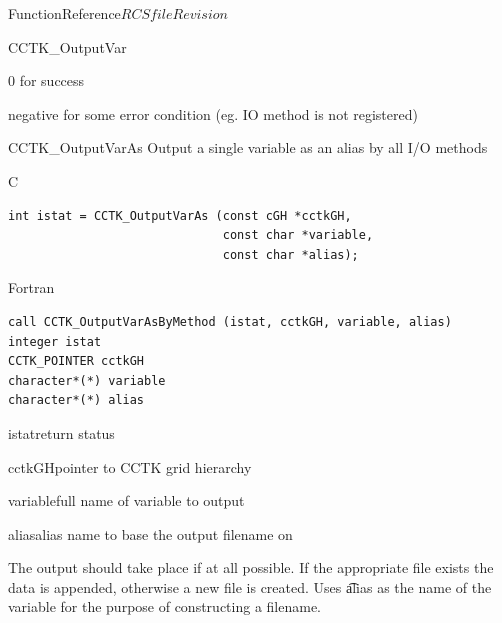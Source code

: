 \begin{cactuspart}{FunctionReference}{$RCSfile$}{$Revision$}
\begin{FunctionDescription}{CCTK\_OutputVar}
\begin{ErrorSection}
\begin{Error}{\rm 0}
for success
\end{Error}
\begin{Error}{negative}
for some error condition (eg. IO method is not registered)
\end{Error}
\end{ErrorSection}
\end{FunctionDescription}


\begin{FunctionDescription}{CCTK\_OutputVarAs}
Output a single variable as an alias by all I/O methods
\label{CCTK-OutputVarAs}

\begin{SynopsisSection}
\begin{Synopsis}{C}
\begin{verbatim}
int istat = CCTK_OutputVarAs (const cGH *cctkGH,
                              const char *variable,
                              const char *alias);
\end{verbatim}
\end{Synopsis}
\begin{Synopsis}{Fortran}
\begin{verbatim}
call CCTK_OutputVarAsByMethod (istat, cctkGH, variable, alias)
integer istat
CCTK_POINTER cctkGH
character*(*) variable
character*(*) alias
\end{verbatim}
\end{Synopsis}
\end{SynopsisSection}

\begin{ParameterSection}
\begin{Parameter}{istat}return status\end{Parameter}
\begin{Parameter}{cctkGH}pointer to CCTK grid hierarchy\end{Parameter}
\begin{Parameter}{variable}full name of variable to output\end{Parameter}
\begin{Parameter}{alias}alias name to base the output filename on\end{Parameter}
\end{ParameterSection}

\begin{Discussion}
The output should take place if at all possible.
If the appropriate file exists the data is appended, otherwise a new
file is created. Uses {\t alias} as the name of the variable for the purpose
of constructing a filename.
\end{Discussion}


\end{FunctionDescription}
\end{cactuspart}
